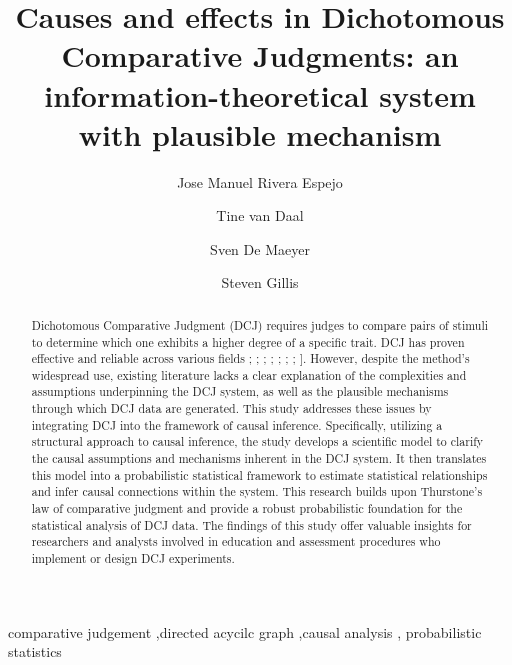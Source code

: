 \documentclass[
  authoryear,
  preprint,
  1p]{elsarticle}
\begin{document}
\begin{frontmatter}
\title{Causes and effects in Dichotomous Comparative Judgments: an
information-theoretical system with plausible mechanism}
\author[1]{Jose Manuel Rivera Espejo%
%
}
\author[1]{Tine van Daal%
%
}
\author[1]{Sven De Maeyer%
%
}
\author[2]{Steven Gillis%
%
}






        
\begin{abstract}
Dichotomous Comparative Judgment (DCJ) requires judges to compare pairs
of stimuli to determine which one exhibits a higher degree of a specific
trait. DCJ has proven effective and reliable across various fields
\citet{Pollitt_2012b}; \citet{Jones_2015}; \citet{vanDaal_et_al_2016};
\citet{Bartholomew_et_al_2018}; \citet{Lesterhuis_2018};
\citet{Bartholomew_et_al_2020}; \citet{Marshall_et_al_2020};
\citet{Boonen_et_al_2020}{]}. However, despite the method's widespread
use, existing literature lacks a clear explanation of the complexities
and assumptions underpinning the DCJ system, as well as the plausible
mechanisms through which DCJ data are generated. This study addresses
these issues by integrating DCJ into the framework of causal inference.
Specifically, utilizing a structural approach to causal inference, the
study develops a scientific model to clarify the causal assumptions and
mechanisms inherent in the DCJ system. It then translates this model
into a probabilistic statistical framework to estimate statistical
relationships and infer causal connections within the system. This
research builds upon Thurstone's law of comparative judgment
\citeyearpar{Thurstone_1927} and provide a robust probabilistic
foundation for the statistical analysis of DCJ data. The findings of
this study offer valuable insights for researchers and analysts involved
in education and assessment procedures who implement or design DCJ
experiments.
\end{abstract}





\begin{keyword}
    comparative judgement \sep directed acycilc graph \sep causal
analysis \sep 
    probabilistic statistics
\end{keyword}
\end{frontmatter}
    
\end{document}
